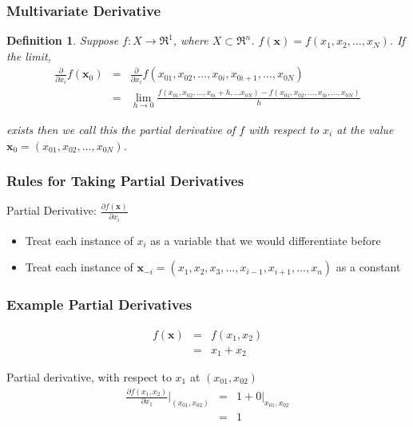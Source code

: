 \documentclass{beamer}
\newtheorem{defn}{Definition}
\numberwithin{equation}{section}
\begin{document}
\begin{frame}
\frametitle{Multivariate Derivative} 
\begin{defn} 
Suppose $f:X \rightarrow \Re^{1}$, where $X \subset \Re^{n}$. $f(\boldsymbol{x}) = f(x_{1}, x_{2}, \hdots, x_{N} ) $.  If the limit, \\
\small
\begin{eqnarray}
\frac{\partial}{\partial x_{i} } f(\boldsymbol{x}_{0}  ) & = & \frac{\partial}{\partial x_{i} }  f(x_{01}, x_{02}, \hdots,x_{0i}, x_{0i+1}, \hdots,  x_{0N} ) \nonumber \\
& = & \lim_{h\rightarrow 0}  \frac{f(x_{01}, x_{02}, \hdots, x_{0i} + h ,  \hdots x_{0N} ) - f(x_{01}, x_{02} , \hdots,x_{0 i},\hdots,  x_{0N} )} {h}  \nonumber 
\end{eqnarray}

exists then we call this the partial derivative of $f$ with respect to $x_{i}$ at the value $\boldsymbol{x}_{0} = (x_{01}, x_{02}, \hdots, x_{0N})$.

\end{defn}
\end{frame}


\begin{frame}
\frametitle{Rules for Taking Partial Derivatives}

Partial Derivative: $\frac{\partial f(\boldsymbol{x}) }{\partial x_{i} }$ \pause
\begin{itemize}
\item[-] Treat each instance of $x_{i}$ as a variable that we would differentiate before \pause
\item[-] Treat each instance of $\boldsymbol{x}_{-i} = (x_{1}, x_{2} , x_{3} , \hdots, x_{i-1}, x_{i+1}, \hdots, x_{n})$ as a constant
\end{itemize}

\end{frame}


\begin{frame}
\frametitle{Example Partial Derivatives} 


\begin{eqnarray}
f(\boldsymbol{x}) & = & f(x_{1}, x_{2}) \nonumber \\
							& = & x_{1} + x_{2}\nonumber 
\end{eqnarray}							

Partial derivative, with respect to $x_{1}$ at $(x_{01}, x_{02})$
\begin{eqnarray}
\frac{\partial f(x_{1}, x_{2} ) } {\partial x_{1} }|_{(x_{01}, x_{02} )} & = &  1 + 0|_{x_{01}, x_{02}}  \nonumber \\
																	& = & 1 \nonumber 
\end{eqnarray}																	


\end{frame}
\end{document}
